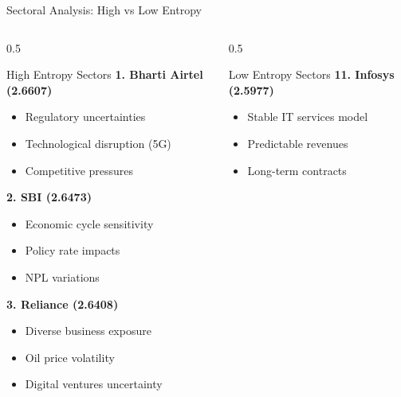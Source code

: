 \documentclass[aspectratio=169,12pt,xcolor=table]{beamer}
\begin{document}
\begin{frame}{Sectoral Analysis: High vs Low Entropy}
\begin{columns}[T]
\begin{column}{0.5\textwidth}
    \begin{block}{High Entropy Sectors}
        \textbf{1. Bharti Airtel (2.6607)} \\
        \small
        \begin{itemize}
            \item Regulatory uncertainties
            \item Technological disruption (5G)
            \item Competitive pressures
        \end{itemize}
        
        \vspace{0.2cm}
        \textbf{2. SBI (2.6473)} \\
        \small
        \begin{itemize}
            \item Economic cycle sensitivity
            \item Policy rate impacts
            \item NPL variations
        \end{itemize}
        
        \vspace{0.2cm}
        \textbf{3. Reliance (2.6408)} \\
        \small
        \begin{itemize}
            \item Diverse business exposure
            \item Oil price volatility
            \item Digital ventures uncertainty
        \end{itemize}
    \end{block}
\end{column}

\begin{column}{0.5\textwidth}
    \begin{block}{Low Entropy Sectors}
        \textbf{11. Infosys (2.5977)} \\
        \small
        \begin{itemize}
            \item Stable IT services model
            \item Predictable revenues
            \item Long-term contracts
        \end{itemize}
        

\end{block}
\end{column}
\end{columns}
\end{frame}
\end{document}
